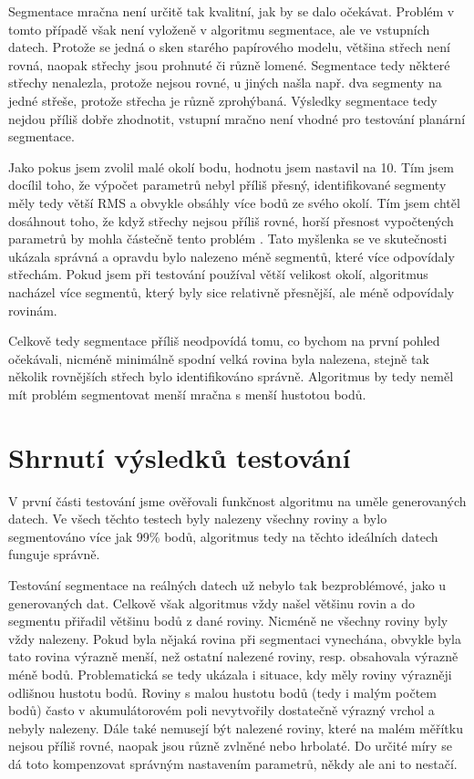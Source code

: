 \documentclass[11pt,twoside,a4paper]{book}
\begin{document}
Segmentace mračna není určitě tak kvalitní, jak by se dalo očekávat. Problém v tomto případě však není vyloženě v algoritmu segmentace, ale ve vstupních datech. Protože se jedná o sken starého papírového modelu, většina střech není rovná, naopak střechy jsou prohnuté či různě lomené. Segmentace tedy některé střechy nenalezla, protože nejsou rovné, u jiných našla např. dva segmenty na jedné střeše, protože střecha je různě zprohýbaná. Výsledky segmentace tedy nejdou příliš dobře zhodnotit, vstupní mračno není vhodné pro testování planární segmentace.

Jako pokus jsem zvolil malé okolí bodu, hodnotu jsem nastavil na 10. Tím jsem docílil toho, že výpočet parametrů nebyl příliš přesný, identifikované segmenty měly tedy větší RMS a obvykle obsáhly více bodů ze svého okolí. Tím jsem chtěl dosáhnout toho, že když střechy nejsou příliš rovné, horší přesnost vypočtených parametrů by mohla částečně tento problém . Tato myšlenka se ve skutečnosti ukázala správná a opravdu bylo nalezeno méně segmentů, které více odpovídaly střechám. Pokud jsem při testování používal větší velikost okolí, algoritmus nacházel více segmentů, který byly sice relativně přesnější, ale méně odpovídaly  rovinám.

Celkově tedy segmentace příliš neodpovídá tomu, co bychom na první pohled očekávali, nicméně minimálně spodní velká rovina byla nalezena, stejně tak několik rovnějších střech bylo identifikováno správně. Algoritmus by tedy neměl mít problém segmentovat menší mračna s menší hustotou bodů.


\newpage
\section{Shrnutí výsledků testování}

V první části testování jsme ověřovali funkčnost algoritmu na uměle generovaných datech. Ve všech těchto testech byly nalezeny všechny roviny a bylo segmentováno více jak 99\% bodů, algoritmus tedy na těchto ideálních datech funguje správně.

Testování segmentace na reálných datech už nebylo tak bezproblémové, jako u generovaných dat. Celkově však algoritmus vždy našel většinu rovin a do segmentu přiřadil většinu bodů z dané roviny. Nicméně ne všechny roviny byly vždy nalezeny. Pokud byla nějaká rovina při segmentaci vynechána, obvykle byla tato rovina výrazně menší, než ostatní nalezené roviny, resp. obsahovala výrazně méně bodů. Problematická se tedy ukázala i situace, kdy měly roviny výrazněji odlišnou hustotu bodů. Roviny s malou hustotu bodů (tedy i malým počtem bodů) často v akumulátorovém poli nevytvořily dostatečně výrazný vrchol a nebyly nalezeny. Dále také nemusejí být nalezené roviny, které na malém měřítku nejsou příliš rovné, naopak jsou různě zvlněné nebo hrbolaté. Do určité míry se dá toto kompenzovat správným nastavením parametrů, někdy ale ani to nestačí. 
\end{document}

